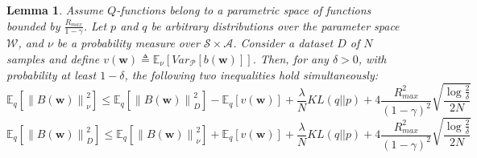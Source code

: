 \documentclass{article}
\newtheorem{lemma}{Lemma}
\newcommand{\norm}[1]{\left\lVert #1 \right\rVert}
\begin{document}
\begin{lemma}\label{lemma:l2}
Assume $Q$-functions belong to a parametric space of functions bounded by $\frac{R_{max}}{1-\gamma}$. Let $p$ and $q$ be arbitrary distributions over the parameter space $\mathcal{W}$, and $\nu$ be a probability measure over $\mathcal{S}\times\mathcal{A}$. Consider a dataset $D$ of $N$ samples and define $v(\bm{w}) \triangleq \mathbb{E}_{\nu}\left[Var_{\mathcal{P}}\left[b(\bm{w})\right]\right]$. Then, for any $\delta > 0$, with probability at least $1-\delta$, the following two inequalities hold simultaneously:
\begin{equation}\label{eq:lemma2-1}
\mathbb{E}_q\left[ \norm{B(\bm{w})}_{\nu}^2 \right ] \leq \mathbb{E}_q\left[ \norm{B(\bm{w})}_D^2 \right] - \mathbb{E}_q\left[ v(\bm{w}) \right] + \frac{\lambda}{N} KL(q||p) + 4\frac{R_{max}^2}{(1-\gamma)^2}\sqrt{\frac{\log\frac{2}{\delta}}{2N}}
\end{equation}
\begin{equation}\label{eq:lemma2-2}
\mathbb{E}_q\left[ \norm{B(\bm{w})}_D^2 \right] \leq \mathbb{E}_q\left[ \norm{B(\bm{w})}_{\nu}^2 \right ] + \mathbb{E}_q\left[ v(\bm{w}) \right] + \frac{\lambda}{N} KL(q||p) + 4\frac{R_{max}^2}{(1-\gamma)^2}\sqrt{\frac{\log\frac{2}{\delta}}{2N}}
\end{equation}
\end{lemma}
\end{document}

